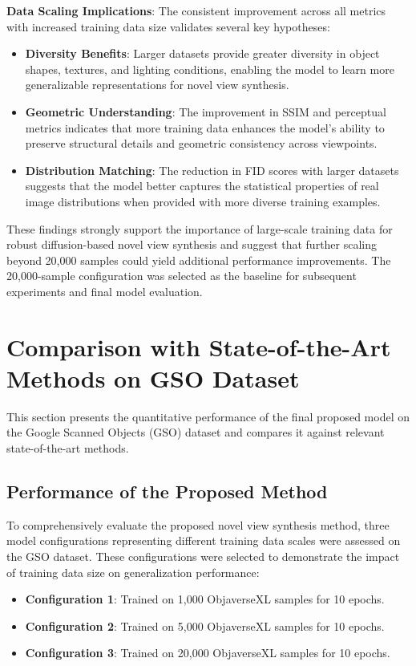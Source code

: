 \textbf{Data Scaling Implications}:
The consistent improvement across all metrics with increased training data size validates several key hypotheses:
\begin{itemize}
  \item \textbf{Diversity Benefits}: Larger datasets provide greater diversity in object shapes, textures, and lighting conditions, enabling the model to learn more generalizable representations for novel view synthesis.
  \item \textbf{Geometric Understanding}: The improvement in SSIM and perceptual metrics indicates that more training data enhances the model's ability to preserve structural details and geometric consistency across viewpoints.
  \item \textbf{Distribution Matching}: The reduction in FID scores with larger datasets suggests that the model better captures the statistical properties of real image distributions when provided with more diverse training examples.
\end{itemize}

These findings strongly support the importance of large-scale training data for robust diffusion-based novel view synthesis and suggest that further scaling beyond 20,000 samples could yield additional performance improvements. The 20,000-sample configuration was selected as the baseline for subsequent experiments and final model evaluation.

\section{Comparison with State-of-the-Art Methods on GSO Dataset}\label{sec:exp_gso_quantitative_sota}

This section presents the quantitative performance of the final proposed model on the Google Scanned Objects (GSO) dataset and compares it against relevant state-of-the-art methods.

\subsection{Performance of the Proposed Method}\label{ssec:exp_gso_our_model}
To comprehensively evaluate the proposed novel view synthesis method, three model configurations representing different training data scales were assessed on the GSO dataset. These configurations were selected to demonstrate the impact of training data size on generalization performance:

\begin{itemize}
  \item \textbf{Configuration 1}: Trained on 1,000 ObjaverseXL samples for 10 epochs.
  \item \textbf{Configuration 2}: Trained on 5,000 ObjaverseXL samples for 10 epochs.
  \item \textbf{Configuration 3}: Trained on 20,000 ObjaverseXL samples for 10 epochs.
\end{itemize}

